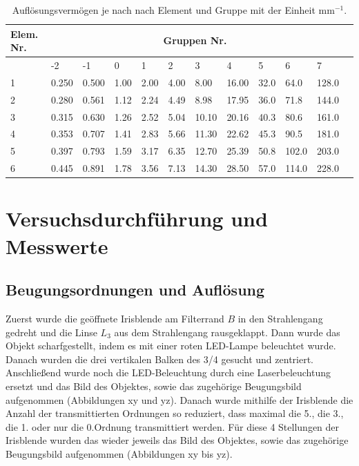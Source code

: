 \documentclass{article}
\begin{document}
\begin{table}
\caption{Auflösungsvermögen je nach nach Element und Gruppe mit der Einheit mm$^{-1}$.}
\label{tab:aufl}
\begin{tabular}{|l||l|l|l|l|l|l|l|l|l|l|l|}
\hline
\textbf{Elem. Nr.} & \multicolumn{10}{|c|}{\textbf{Gruppen Nr.}}\\
\hline
& -2 & -1 & 0 & 1 & 2 & 3 & 4 & 5 & 6 & 7 \\
\hline
1 & 0.250 & 0.500 & 1.00 & 2.00 & 4.00 & 8.00 & 16.00 & 32.0 & 64.0 & 128.0 \\
\hline
2 & 0.280 & 0.561 & 1.12 & 2.24 & 4.49 & 8.98 & 17.95 & 36.0 & 71.8 & 144.0 \\
\hline
3 & 0.315 & 0.630 & 1.26 & 2.52 & 5.04 & 10.10 & 20.16 & 40.3 & 80.6 &  161.0 \\
\hline
4 & 0.353 & 0.707 & 1.41 & 2.83 & 5.66 & 11.30 & 22.62 & 45.3 & 90.5 & 181.0 \\
\hline
5 & 0.397 & 0.793 & 1.59 & 3.17 & 6.35 & 12.70 & 25.39 & 50.8 & 102.0 & 203.0 \\
\hline
6 & 0.445 & 0.891 & 1.78 & 3.56 & 7.13 & 14.30 & 28.50 & 57.0 & 114.0 & 228.0 \\
\hline
\end{tabular}
\end{table}







\section{Versuchsdurchführung und Messwerte}

\subsection{Beugungsordnungen und Auflösung}


Zuerst wurde die geöffnete Irisblende am Filterrand $B$ in den Strahlengang gedreht und die Linse $L_3$ aus dem Strahlengang rausgeklappt. Dann wurde das Objekt scharfgestellt, indem es mit einer roten LED-Lampe beleuchtet wurde. Danach wurden die drei vertikalen Balken des 3/4 gesucht und zentriert. Anschließend wurde noch die LED-Beleuchtung durch eine Laserbeleuchtung ersetzt und das Bild des Objektes, sowie das zugehörige Beugungsbild aufgenommen (Abbildungen xy und yz).
Danach wurde mithilfe der Irisblende die Anzahl der transmittierten Ordnungen so reduziert, dass maximal die 5., die 3., die 1. oder nur die 0.Ordnung transmittiert werden. Für diese 4 Stellungen der Irisblende wurden das wieder jeweils das Bild des Objektes, sowie das zugehörige Beugungsbild aufgenommen (Abbildungen xy bis yz).
\newpage
\end{document}
